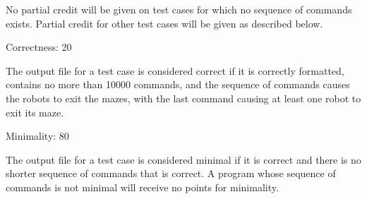 No partial credit will be given on test cases for which no sequence of commands exists. Partial credit for other test cases will be given as described below.

Correctness: 20%

The output file for a test case is considered correct if it is correctly formatted, contains no more than 10000 commands, and the sequence of commands causes the robots to exit the mazes, with the last command causing at least one robot to exit its maze.

Minimality: 80%

The output file for a test case is considered minimal if it is correct and there is no shorter sequence of commands that is correct. A program whose sequence of commands is not minimal will receive no points for minimality.